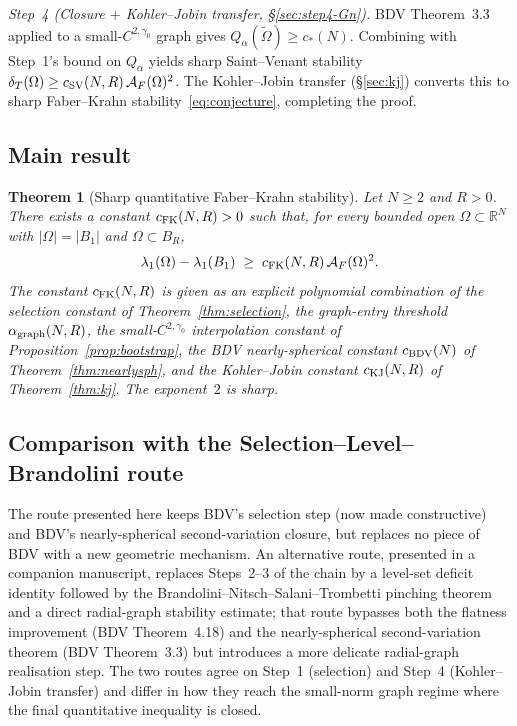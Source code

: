 \documentclass[11pt]{amsart}
\newtheorem{theorem}{Theorem}[section]
\theoremstyle{definition}
\newcommand{\R}{\mathbb R}
\newcommand{\dT}{\delta_T}
\newcommand{\AF}{\mathcal A_F}
\begin{document}
\smallskip
\noindent\emph{Step~4 (Closure $+$ Kohler--Jobin transfer,
\S\ref{sec:step4-Gn}).}  BDV Theorem~3.3 applied to a small-$C^{2,
\gamma_0}$ graph gives $Q_\alpha(\widetilde\Omega)\ge c_*(N)$.
Combining with Step~1's bound on $Q_\alpha$ yields sharp Saint--Venant
stability $\dT(\Omega)\ge c_{\rm SV}(N,R)\,\AF(\Omega)^{2}$.  The
Kohler--Jobin transfer (\S\ref{sec:kj}) converts this to sharp
Faber--Krahn stability~\eqref{eq:conjecture}, completing the proof.

\subsection*{Main result}

\begin{theorem}[Sharp quantitative Faber--Krahn stability]\label{thm:main}
Let $N\ge 2$ and $R>0$.  There exists a constant
$c_{\rm FK}(N,R)>0$ such that, for every bounded open
$\Omega\subset\R^N$ with $|\Omega|=|B_1|$ and
$\Omega\subset B_R$,
\[
   \lambda_1(\Omega)-\lambda_1(B_1)
   \;\ge\;c_{\rm FK}(N,R)\,\AF(\Omega)^{2}.
\]
The constant $c_{\rm FK}(N,R)$ is given as an explicit polynomial
combination of the selection constant of Theorem~\ref{thm:selection},
the graph-entry threshold $\alpha_{\rm graph}(N,R)$, the
small-$C^{2,\gamma_0}$ interpolation constant of
Proposition~\ref{prop:bootstrap}, the BDV nearly-spherical constant
$c_{\rm BDV}(N)$ of Theorem~\ref{thm:nearlysph}, and the Kohler--Jobin
constant $c_{\rm KJ}(N,R)$ of Theorem~\ref{thm:kj}.  The exponent~$2$
is sharp.
\end{theorem}

\subsection*{Comparison with the Selection--Level--Brandolini route}

The route presented here keeps BDV's selection step (now made
constructive) and BDV's nearly-spherical second-variation closure,
but replaces no piece of BDV with a new geometric mechanism.  An
alternative route, presented in a companion manuscript, replaces
Steps~2--3 of the chain by a level-set deficit identity followed by
the Brandolini--Nitsch--Salani--Trombetti pinching theorem and a
direct radial-graph stability estimate; that route bypasses both the
flatness improvement (BDV Theorem~4.18) and the nearly-spherical
second-variation theorem (BDV Theorem~3.3) but introduces a more
delicate radial-graph realisation step.  The two routes agree on
Step~1 (selection) and Step~4 (Kohler--Jobin transfer) and differ in
how they reach the small-norm graph regime where the final
quantitative inequality is closed.
\end{document}
